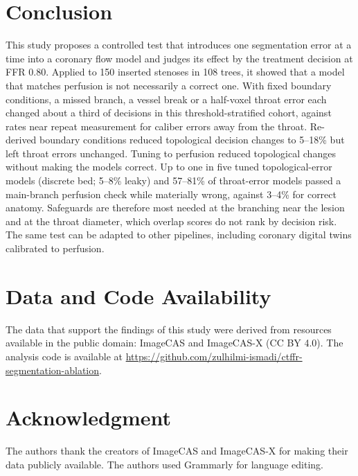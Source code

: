 \documentclass[journal,twoside,web]{ieeecolor}
\begin{document}
\section{Conclusion}
This study proposes a controlled test that introduces one segmentation error at a time into a coronary flow model and judges
its effect by the treatment decision at FFR 0.80. Applied to 150 inserted stenoses in 108 trees, it showed that a model that matches
perfusion is not necessarily a correct one. With fixed boundary conditions, a missed branch, a vessel break or a half-voxel throat error each changed about a
third of decisions in this threshold-stratified cohort, against rates near repeat measurement for caliber errors
away from the throat. Re-derived boundary conditions reduced topological decision changes to 5--18\% but left
throat errors unchanged. Tuning to perfusion reduced topological changes without making the models correct. Up to one in five tuned topological-error models (discrete bed; 5--8\% leaky) and 57--81\% of throat-error models passed a main-branch perfusion check while materially wrong, against 3--4\% for correct anatomy. Safeguards are therefore most
needed at the branching near the lesion and at the throat diameter, which overlap scores do not rank by decision risk.
The same test can be adapted to other
pipelines, including coronary digital twins calibrated to perfusion.

\section*{Data and Code Availability}
The data that support the findings of this study were derived from resources available in the public domain: ImageCAS \cite{zeng2023} and ImageCAS-X \cite{imagecasx_data} (CC BY 4.0). The analysis code is available at \url{https://github.com/zulhilmi-ismadi/ctffr-segmentation-ablation}.

\section*{Acknowledgment}
The authors thank the creators of ImageCAS and ImageCAS-X for making their data publicly available. The authors
used Grammarly for language editing.



\end{document}
